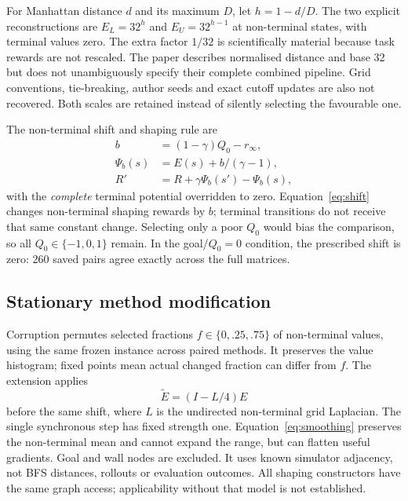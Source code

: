\documentclass{COMPXXXX}
\begin{document}
For Manhattan distance $d$ and its maximum $D$, let $h=1-d/D$. The two explicit reconstructions are $E_L=32^h$ and $E_U=32^{h-1}$ at non-terminal states, with terminal values zero. The extra factor $1/32$ is scientifically material because task rewards are not rescaled. The paper describes normalised distance and base 32 but does not unambiguously specify their complete combined pipeline. Grid conventions, tie-breaking, author seeds and exact cutoff updates are also not recovered. Both scales are retained instead of silently selecting the favourable one.

The non-terminal shift and shaping rule are
\begin{equation}
\begin{split}
b&=(1-\gamma)Q_0-r_\infty,\\
\Psi_b(s)&=E(s)+b/(\gamma-1),\\
R'&=R+\gamma\Psi_b(s')-\Psi_b(s),
\end{split}
\label{eq:shift}
\end{equation}
with the \emph{complete} terminal potential overridden to zero. Equation~\ref{eq:shift} changes non-terminal shaping rewards by $b$; terminal transitions do not receive that same constant change. Selecting only a poor $Q_0$ would bias the comparison, so all $Q_0\in\{-1,0,1\}$ remain. In the goal/$Q_0=0$ condition, the prescribed shift is zero: 260 saved pairs agree exactly across the full matrices.

\subsection{Stationary method modification}
Corruption permutes selected fractions $f\in\{0,.25,.75\}$ of non-terminal values, using the same frozen instance across paired methods. It preserves the value histogram; fixed points mean actual changed fraction can differ from $f$. The extension applies
\begin{equation}
\widetilde E=(I-L/4)E
\label{eq:smoothing}
\end{equation}
before the same shift, where $L$ is the undirected non-terminal grid Laplacian. The single synchronous step has fixed strength one. Equation~\ref{eq:smoothing} preserves the non-terminal mean and cannot expand the range, but can flatten useful gradients. Goal and wall nodes are excluded. It uses known simulator adjacency, not BFS distances, rollouts or evaluation outcomes. All shaping constructors have the same graph access; applicability without that model is not established.
\end{document}
